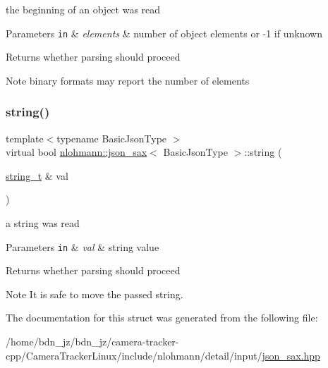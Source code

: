 the beginning of an object was read 


\begin{DoxyParams}[1]{Parameters}
\mbox{\tt in}  & {\em elements} & number of object elements or -\/1 if unknown \\
\hline
\end{DoxyParams}
\begin{DoxyReturn}{Returns}
whether parsing should proceed 
\end{DoxyReturn}
\begin{DoxyNote}{Note}
binary formats may report the number of elements 
\end{DoxyNote}
\mbox{\label{structnlohmann_1_1json__sax_a07eab82f6c82d606787eee9ad73d2bda}} 
\subsubsection{\texorpdfstring{string()}{string()}}
{\footnotesize\ttfamily template$<$typename Basic\+Json\+Type $>$ \\
virtual bool \hyperlink{structnlohmann_1_1json__sax}{nlohmann\+::json\+\_\+sax}$<$ Basic\+Json\+Type $>$\+::string (\begin{DoxyParamCaption}\item[{\hyperlink{structnlohmann_1_1json__sax_ae01977a9f3c5b3667b7a2929ed91061e}{string\+\_\+t} \&}]{val }\end{DoxyParamCaption})\hspace{0.3cm}{\ttfamily [pure virtual]}}



a string was read 


\begin{DoxyParams}[1]{Parameters}
\mbox{\tt in}  & {\em val} & string value \\
\hline
\end{DoxyParams}
\begin{DoxyReturn}{Returns}
whether parsing should proceed 
\end{DoxyReturn}
\begin{DoxyNote}{Note}
It is safe to move the passed string. 
\end{DoxyNote}


The documentation for this struct was generated from the following file\+:\begin{DoxyCompactItemize}
\item 
/home/bdn\+\_\+jz/bdn\+\_\+jz/camera-\/tracker-\/cpp/\+Camera\+Tracker\+Linux/include/nlohmann/detail/input/\hyperlink{json__sax_8hpp}{json\+\_\+sax.\+hpp}\end{DoxyCompactItemize}
